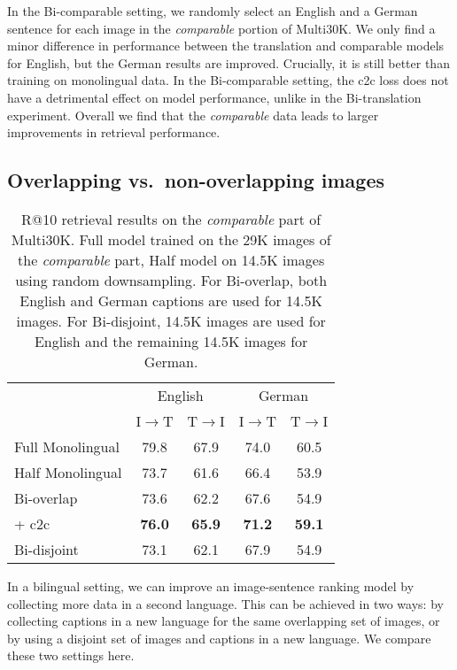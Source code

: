 In the Bi-comparable setting, we randomly select an English and a German sentence for each image in the {\it comparable} portion of Multi30K. We only find a minor difference in performance between the translation and comparable models for English, but the German results are improved. Crucially, it is still better than training on monolingual data. In the Bi-comparable setting, the c2c loss does not have a detrimental effect on model performance, unlike in the Bi-translation experiment. Overall we find that the \emph{comparable} data leads to larger improvements in retrieval performance.%



\subsection{Overlapping vs.\ non-overlapping images}
\label{sec:bioverlap}

\begin{table}
\centering
\renewcommand{\arraystretch}{1.3}
\begin{tabular}{lcccc}
\toprule
& \multicolumn{2}{c}{English} &  \multicolumn{2}{c}{German} \\
 & I$\rightarrow$T & T$\rightarrow$I & I$\rightarrow$T & T$\rightarrow$I \\
\midrule
Full Monolingual			& 79.8 & 67.9 & 74.0 & 60.5\\
Half Monolingual			& 73.7 & 61.6 & 66.4 & 53.9 \\
\midrule
Bi-overlap				& 73.6 & 62.2 & 67.6 &  54.9 \\
+ c2c 		& \bf{76.0} & \bf{65.9} & \bf{71.2}  & \bf{59.1}\\
\midrule
Bi-disjoint 	& 73.1 & 62.1 & 67.9 &  54.9\\
\bottomrule
\end{tabular}
\caption{R@10 retrieval results on the \emph{comparable} part of Multi30K. Full model trained on the 29K images of the \emph{comparable} part, Half model on 14.5K images using random downsampling. For Bi-overlap, both English and German captions are used for 14.5K images. For Bi-disjoint, 14.5K images are used for English and the remaining 14.5K images for German.}
\label{tab:half}
\end{table}

In a bilingual setting, we can improve an image-sentence ranking model by collecting more data in a second language. This can be achieved in two ways:  by collecting captions in a new language for the same overlapping set of images, or by  using a disjoint set of images and captions in a new language. We compare these two settings here.

